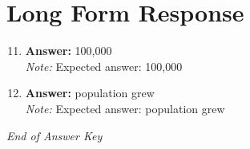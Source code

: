 \documentclass[12pt]{article}
\begin{document}
\section*{Long Form Response}
\begin{enumerate}[label=\arabic*.]
\setcounter{enumi}{10}
\item \textbf{Answer:} 100,000
\\ \textit{Note:} Expected answer: 100,000
\item \textbf{Answer:} population grew
\\ \textit{Note:} Expected answer: population grew
\end{enumerate}

\vfill
\noindent\textit{End of Answer Key}
\end{document}
